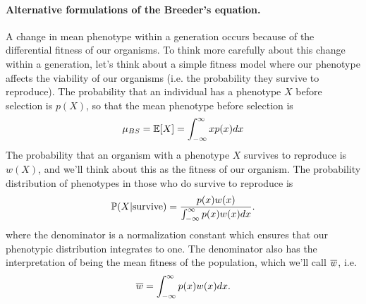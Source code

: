 \paragraph{Alternative formulations of the Breeder's equation.}
A change in mean phenotype within a generation occurs because of the
differential fitness of our organisms. To think more carefully about this change within a
generation, let's think about a simple fitness model where our phenotype affects the
viability of our organisms (i.e. the probability they survive to
reproduce). The probability that an individual has a phenotype $X$
before selection is $p(X)$, so that the mean phenotype before
selection is
\begin{equation}
\mu_{BS} = \E[X] =  \int_{-\infty}^{\infty} x p(x) dx
\end{equation}
The probability that an organism with a phenotype $X$ survives to
reproduce is $w(X)$, and we'll think about this as the fitness of
our organism. The probability distribution of phenotypes in those who
do survive to reproduce is
\begin{equation}
\P(X | \textrm{survive}) =  \frac{p(x) w(x)}{
\int_{-\infty}^{\infty} p(x) w(x) dx}.
\end{equation}
where the denominator is a normalization constant which ensures that
our phenotypic distribution integrates to one. The denominator also
has the interpretation of being the mean fitness of the population,
which we'll call $\wbar$, i.e.  
\begin{equation}
\wbar =  
\int_{-\infty}^{\infty} p(x) w(x) dx.
\end{equation}

